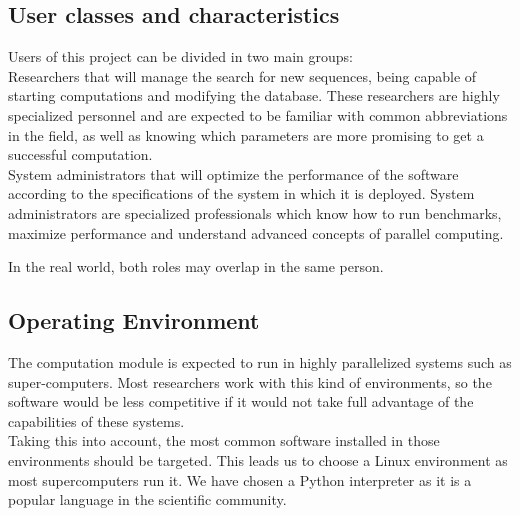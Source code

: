   \subsection{User classes and characteristics}

  Users of this project can be divided in two main groups:\\

  Researchers that will manage the search for new sequences, being capable of
  starting computations and modifying the database. These researchers are highly
  specialized personnel and are expected to be familiar with common abbreviations in
  the field, as well as knowing which parameters are more promising to get a
  successful computation.\\

  System administrators that will optimize the performance of the software according to the
  specifications of the system in which it is deployed. System administrators
  are specialized professionals which know how to run benchmarks, maximize
  performance and understand advanced concepts of parallel computing.


  In the real world, both roles may overlap in the same person.\\

  \subsection{Operating Environment}

  The computation module is expected to run in highly parallelized systems such
  as super-computers. Most researchers work with this kind of environments, so the software
  would be less competitive if it would not take full advantage of
  the capabilities of these systems.\\

  Taking this into account, the most common software installed in those environments should be
  targeted. This leads us to choose a Linux environment as most supercomputers
  run it.   We have chosen a Python interpreter as it is a popular language in the scientific
  community.\\
